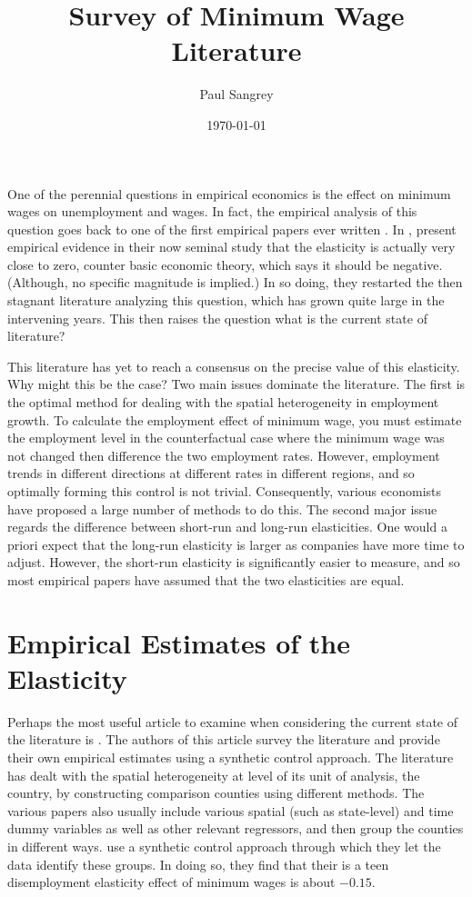 \documentclass[11pt]{amsart}
\title{Survey of Minimum Wage Literature}
\date{\today}
\author{Paul Sangrey}
\begin{document}
\maketitle

One of the perennial questions in empirical economics is the effect on minimum wages on unemployment and wages.
In fact, the empirical analysis of this question goes back to one of the first empirical papers ever written \cite{obenauer1915effect}.
In \citeyear{card1994minimum}, \citeauthor{card1994minimum} present empirical evidence in their now seminal study that the elasticity is actually very close to zero, counter basic economic theory, which says it should be negative. 
(Although, no specific magnitude is implied.)
In so doing, they restarted the then stagnant literature analyzing this question, which has grown quite large in the intervening years.
This then raises the question what is the current state of literature?

This literature has yet to reach a consensus on the precise value of this elasticity.
Why might this be the case?
Two main issues dominate the literature.
The first is the optimal method for dealing with the spatial heterogeneity in employment growth.
To calculate the employment effect of minimum wage, you must estimate the employment level in the counterfactual case where the minimum wage was not changed then difference the two employment rates.
However, employment  trends in different directions at different rates in different regions, and so optimally forming this control is not trivial.
Consequently, various economists have proposed a large number of methods to do this.
The second major issue regards the difference between short-run and long-run elasticities.
One would a priori expect that the long-run elasticity is larger as companies have more time to adjust. 
However, the short-run elasticity is significantly easier to measure, and so most empirical papers have assumed that the two elasticities are equal.


\section*{Empirical Estimates of the Elasticity}


Perhaps the most useful article to examine when considering the current state of the literature is \cite{neumark2014revisiting}.
The authors of this article survey the literature and provide their own empirical estimates using a synthetic control approach. 
The literature has dealt with the spatial heterogeneity at level of its unit of analysis, the country, by constructing comparison counties using different methods.
The various papers also usually include various spatial (such as state-level) and time dummy variables as well as other relevant regressors, and then group the counties in different ways.
\citeauthor{neumark2014revisiting} use a synthetic control approach through which they let the data identify these groups.
In doing so, they find that their is a teen disemployment elasticity effect of minimum wages is about $-0.15$. 
\end{document}
